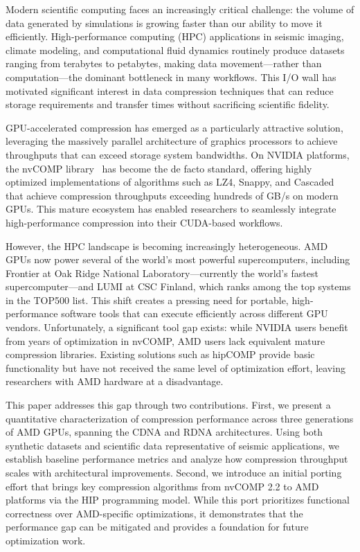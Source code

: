 \documentclass[runningheads]{llncs}
\begin{document}
Modern scientific computing faces an increasingly critical challenge: the volume of data generated by simulations is growing faster than our ability to move it efficiently. High-performance computing (HPC) applications in seismic imaging, climate modeling, and computational fluid dynamics routinely produce datasets ranging from terabytes to petabytes, making data movement---rather than computation---the dominant bottleneck in many workflows. This I/O wall has motivated significant interest in data compression techniques that can reduce storage requirements and transfer times without sacrificing scientific fidelity.

GPU-accelerated compression has emerged as a particularly attractive solution, leveraging the massively parallel architecture of graphics processors to achieve throughputs that can exceed storage system bandwidths. On NVIDIA platforms, the nvCOMP library~\cite{nvcomp} has become the de facto standard, offering highly optimized implementations of algorithms such as LZ4, Snappy, and Cascaded that achieve compression throughputs exceeding hundreds of GB/s on modern GPUs. This mature ecosystem has enabled researchers to seamlessly integrate high-performance compression into their CUDA-based workflows.

However, the HPC landscape is becoming increasingly heterogeneous. AMD GPUs now power several of the world's most powerful supercomputers, including Frontier at Oak Ridge National Laboratory---currently the world's fastest supercomputer---and LUMI at CSC Finland, which ranks among the top systems in the TOP500 list. This shift creates a pressing need for portable, high-performance software tools that can execute efficiently across different GPU vendors. Unfortunately, a significant tool gap exists: while NVIDIA users benefit from years of optimization in nvCOMP, AMD users lack equivalent mature compression libraries. Existing solutions such as hipCOMP provide basic functionality but have not received the same level of optimization effort, leaving researchers with AMD hardware at a disadvantage.

This paper addresses this gap through two contributions. First, we present a quantitative characterization of compression performance across three generations of AMD GPUs, spanning the CDNA and RDNA architectures. Using both synthetic datasets and scientific data representative of seismic applications, we establish baseline performance metrics and analyze how compression throughput scales with architectural improvements. Second, we introduce an initial porting effort that brings key compression algorithms from nvCOMP 2.2 to AMD platforms via the HIP programming model. While this port prioritizes functional correctness over AMD-specific optimizations, it demonstrates that the performance gap can be mitigated and provides a foundation for future optimization work.
\end{document}
